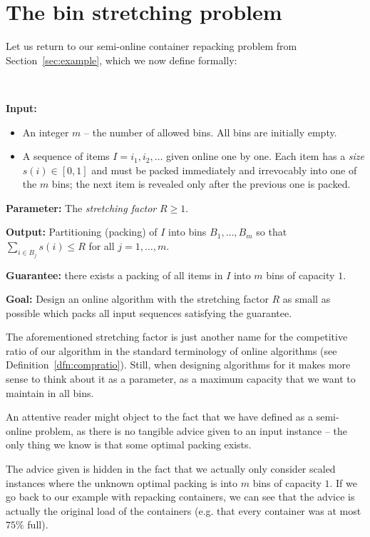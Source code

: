 \section{The bin stretching problem}\label{sec:1:binstretchdef}

Let us return to our semi-online container repacking problem from
Section~\ref{sec:example}, which we now define formally:

\begin{prb}[\binstretch]~

\noindent\textbf{Input:}

\begin{itemize}
\item An integer $m$ --  the number of allowed bins. All bins are initially empty.
\item A sequence of items $I=i_1, i_2, \ldots$ given online one by one. Each item has
a {\it size} $s(i) \in [0,1]$ and must be packed immediately and irrevocably into one of the $m$ bins; the next item
is revealed only after the previous one is packed.
\end{itemize}

\noindent\textbf{Parameter:} The {\it stretching factor} $R\geq 1$.

\noindent\textbf{Output:} Partitioning (packing) of $I$ into bins $B_1,\ldots,B_m$
so that $\sum_{i\in B_j}s(i)\leq R$ for all $j=1,\ldots,m$.

\noindent\textbf{Guarantee:} there exists a packing of all items in $I$ into $m$
bins of capacity $1$. 

\noindent\textbf{Goal:} Design an online algorithm with the stretching factor $R$
as small as possible which packs all input sequences satisfying the
guarantee.
\end{prb}
\medskip

The aforementioned stretching factor is just another name for the
competitive ratio of our algorithm in the standard terminology of
online algorithms (see Definition~\ref{dfn:compratio}). Still, when
designing algorithms for \binstretch it makes more sense to think
about it as a parameter, as a maximum capacity that we want to
maintain in all bins.

An attentive reader might object to the fact that we have defined
\binstretch as a semi-online problem, as there is no tangible advice
given to an input instance -- the only thing we know is that some
optimal packing exists.

The advice given is hidden in the fact that we actually only consider
scaled instances where the unknown optimal packing is into $m$ bins of
capacity $1$. If we go back to our example with repacking containers,
we can see that the advice is actually the original load of the
containers (e.g. that every container was at most $75\%$ full).


